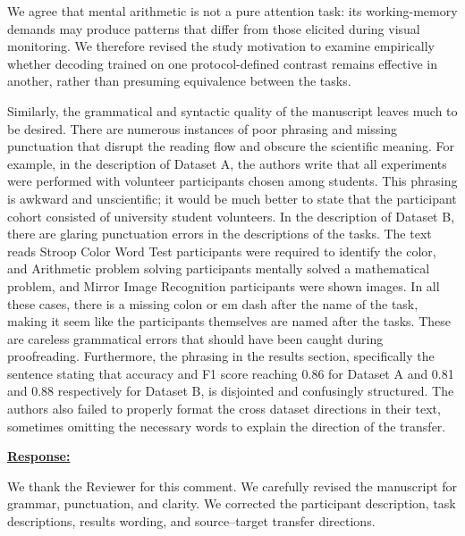 \documentclass{article}
\begin{document}
We agree that mental arithmetic is not a pure attention task: its
working-memory demands may produce patterns that differ from those elicited
during visual monitoring. We therefore revised the study motivation to examine
empirically whether decoding trained on one protocol-defined contrast remains
effective in another, rather than presuming equivalence between the tasks.

\vspace{0.3cm}


\begin{cmt}{}{}

Similarly, the grammatical and syntactic quality of the manuscript leaves much
to be desired. There are numerous instances of poor phrasing and missing
punctuation that disrupt the reading flow and obscure the scientific meaning.
For example, in the description of Dataset A, the authors write that all
experiments were performed with volunteer participants chosen among students.
This phrasing is awkward and unscientific; it would be much better to state that
the participant cohort consisted of university student volunteers. In the
description of Dataset B, there are glaring punctuation errors in the
descriptions of the tasks. The text reads Stroop Color Word Test participants
were required to identify the color, and Arithmetic problem solving participants
mentally solved a mathematical problem, and Mirror Image Recognition
participants were shown images. In all these cases, there is a missing colon or
em dash after the name of the task, making it seem like the participants
themselves are named after the tasks. These are careless grammatical errors that
should have been caught during proofreading. Furthermore, the phrasing in the
results section, specifically the sentence stating that accuracy and F1 score
reaching 0.86 for Dataset A and 0.81 and 0.88 respectively for Dataset B, is
disjointed and confusingly structured. The authors also failed to properly
format the cross dataset directions in their text, sometimes omitting the
necessary words to explain the direction of the transfer.

\end{cmt}
\vspace{0.1cm}
\noindent
\underline{\textbf{Response:}}
\vspace{0.2cm}

We thank the Reviewer for this comment. We carefully revised the manuscript for
grammar, punctuation, and clarity. We corrected the participant description,
task descriptions, results wording, and source--target transfer directions.
\end{document}

